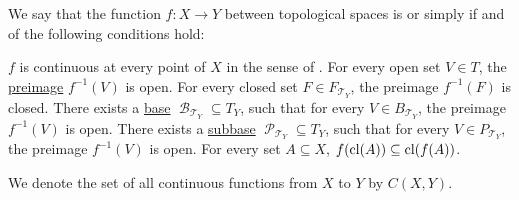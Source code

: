 \begin{definition}\label{def:global_continuity}
  We say that the function \( f: X \to Y \) between topological spaces is  or simply  if and of the following conditions hold:
  \begin{thmenum}
     \( f \) is continuous at every point of \( X \) in the sense of .
     For every open set \( V \in T \), the \hyperref[thm:function_properties/preimage]{preimage} \( f^{-1}(V) \) is open.
     For every closed set \( F \in F_{\mscrT_Y} \), the preimage \( f^{-1}(F) \) is closed.
     There exists a \hyperref[def:topological_base]{base} \( \mscrB_{\mscrT_Y} \subseteq T_Y \), such that for every \( V \in B_{\mscrT_Y} \), the preimage \( f^{-1}(V) \) is open.
     There exists a \hyperref[def:topological_subbase]{subbase} \( \mscrP_{\mscrT_Y} \subseteq T_Y \), such that for every \( V \in P_{\mscrT_Y} \), the preimage \( f^{-1}(V) \) is open.
     For every set \( A \subseteq X \), \( f(\operatorname{cl}(A)) \subseteq \operatorname{cl}(f(A)) \).
  \end{thmenum}

  We denote the set of all continuous functions from \( X \) to \( Y \) by \( C(X, Y) \).
\end{definition}

